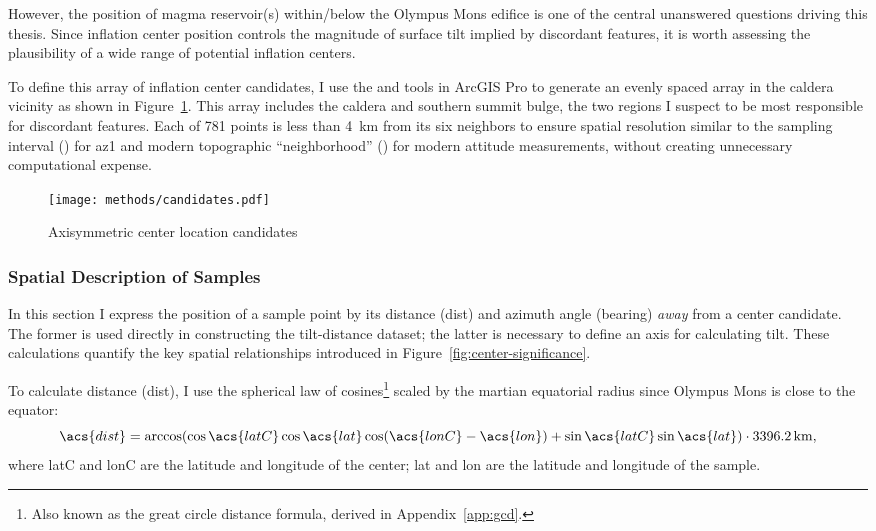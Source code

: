 However, the position of magma reservoir(s) within/below the Olympus Mons edifice is one of the central unanswered questions driving this thesis. Since inflation center position controls the magnitude of surface tilt implied by discordant features, it is worth assessing the plausibility of a wide range of potential inflation centers.

To define this array of inflation center candidates, I use the  and  tools in ArcGIS Pro to generate an evenly spaced array in the caldera vicinity as shown in Figure~\ref{fig:candidates}. This array includes the caldera and southern summit bulge, the two regions I suspect to be most responsible for discordant features. Each of 781 points is less than \qty{4}{\km} from its six neighbors to ensure spatial resolution similar to the sampling interval (\samplinginterval) for \acl{az1} and modern topographic ``neighborhood'' (\neighborhood) for modern attitude measurements, without creating unnecessary computational expense.

\begin{figure}
    \texttt{[image: methods/candidates.pdf]}%
    \caption{Axisymmetric center location candidates}%
    \label{fig:candidates}
\end{figure}

\subsubsection{Spatial Description of Samples}

In this section I express the position of a sample point by its distance (\acs{dist}) and azimuth angle (\acs{bearing}) \emph{away} from a center candidate. The former is used directly in constructing the tilt-distance dataset; the latter is necessary to define an axis for calculating tilt. These calculations quantify the key spatial relationships introduced in Figure~\ref{fig:center-significance}.

To calculate distance (\acs{dist}), I use the spherical law of cosines\footnote{Also known as the great circle distance formula, derived in Appendix~\ref{app:gcd}.} scaled by the martian equatorial radius since Olympus Mons is close to the equator:
\begin{equation}
    \acs{dist}=\arccos(\cos\acs{latC}\cos\acs{lat}\cos(\acs{lonC}-\acs{lon}) + \sin\acs{latC}\sin\acs{lat})\cdot\qty{3396.2}{\km},\label{eq:dist}
\end{equation}
where \acs{latC} and \acs{lonC} are the latitude and longitude of the center; \acs{lat} and \acs{lon} are the latitude and longitude of the sample.

